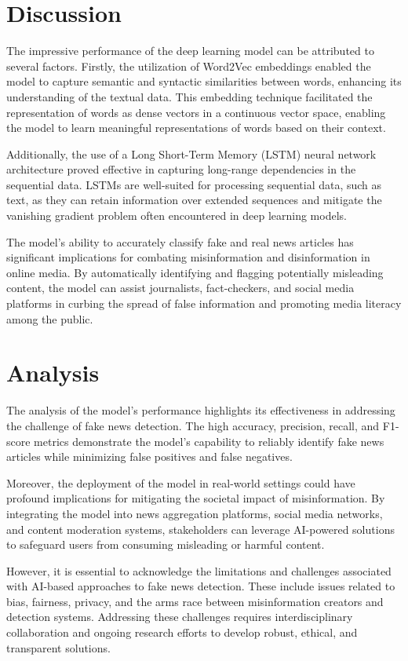 \section{Discussion}

The impressive performance of the deep learning model can be attributed to several factors. Firstly, the utilization of Word2Vec embeddings enabled the model to capture semantic and syntactic similarities between words, enhancing its understanding of the textual data. This embedding technique facilitated the representation of words as dense vectors in a continuous vector space, enabling the model to learn meaningful representations of words based on their context.

Additionally, the use of a Long Short-Term Memory (LSTM) neural network architecture proved effective in capturing long-range dependencies in the sequential data. LSTMs are well-suited for processing sequential data, such as text, as they can retain information over extended sequences and mitigate the vanishing gradient problem often encountered in deep learning models.

The model's ability to accurately classify fake and real news articles has significant implications for combating misinformation and disinformation in online media. By automatically identifying and flagging potentially misleading content, the model can assist journalists, fact-checkers, and social media platforms in curbing the spread of false information and promoting media literacy among the public.

\section{Analysis}

The analysis of the model's performance highlights its effectiveness in addressing the challenge of fake news detection. The high accuracy, precision, recall, and F1-score metrics demonstrate the model's capability to reliably identify fake news articles while minimizing false positives and false negatives.

Moreover, the deployment of the model in real-world settings could have profound implications for mitigating the societal impact of misinformation. By integrating the model into news aggregation platforms, social media networks, and content moderation systems, stakeholders can leverage AI-powered solutions to safeguard users from consuming misleading or harmful content.

However, it is essential to acknowledge the limitations and challenges associated with AI-based approaches to fake news detection. These include issues related to bias, fairness, privacy, and the arms race between misinformation creators and detection systems. Addressing these challenges requires interdisciplinary collaboration and ongoing research efforts to develop robust, ethical, and transparent solutions.

